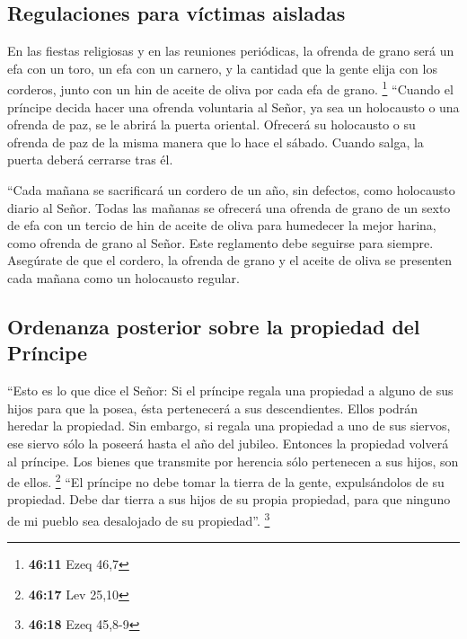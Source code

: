 \hypertarget{regulaciones-para-vuxedctimas-aisladas}{%
\subsection{Regulaciones para víctimas
aisladas}\label{regulaciones-para-vuxedctimas-aisladas}}

 En las fiestas religiosas y en las reuniones periódicas,
la ofrenda de grano será un efa con un toro, un efa con un carnero, y la
cantidad que la gente elija con los corderos, junto con un hin de aceite
de oliva por cada efa de grano. \footnote{\textbf{46:11} Ezeq 46,7}
 ``Cuando el príncipe decida hacer una ofrenda voluntaria
al Señor, ya sea un holocausto o una ofrenda de paz, se le abrirá la
puerta oriental. Ofrecerá su holocausto o su ofrenda de paz de la misma
manera que lo hace el sábado. Cuando salga, la puerta deberá cerrarse
tras él.

 ``Cada mañana se sacrificará un cordero de un año, sin
defectos, como holocausto diario al Señor.  Todas las
mañanas se ofrecerá una ofrenda de grano de un sexto de efa con un
tercio de hin de aceite de oliva para humedecer la mejor harina, como
ofrenda de grano al Señor. Este reglamento debe seguirse para siempre.
 Asegúrate de que el cordero, la ofrenda de grano y el
aceite de oliva se presenten cada mañana como un holocausto regular.

\hypertarget{ordenanza-posterior-sobre-la-propiedad-del-pruxedncipe}{%
\subsection{Ordenanza posterior sobre la propiedad del
Príncipe}\label{ordenanza-posterior-sobre-la-propiedad-del-pruxedncipe}}

 ``Esto es lo que dice el Señor: Si el príncipe regala
una propiedad a alguno de sus hijos para que la posea, ésta pertenecerá
a sus descendientes. Ellos podrán heredar la propiedad. 
Sin embargo, si regala una propiedad a uno de sus siervos, ese siervo
sólo la poseerá hasta el año del jubileo. Entonces la propiedad volverá
al príncipe. Los bienes que transmite por herencia sólo pertenecen a sus
hijos, son de ellos. \footnote{\textbf{46:17} Lev 25,10} 
``El príncipe no debe tomar la tierra de la gente, expulsándolos de su
propiedad. Debe dar tierra a sus hijos de su propia propiedad, para que
ninguno de mi pueblo sea desalojado de su propiedad''. \footnote{\textbf{46:18}
  Ezeq 45,8-9}

